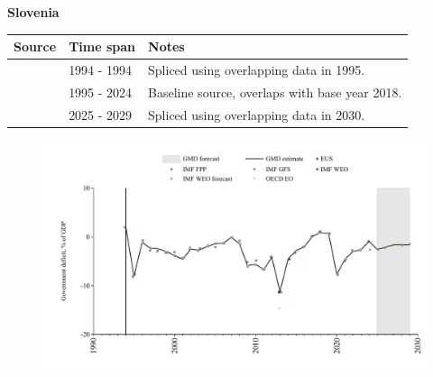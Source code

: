 \documentclass[12pt,a4paper,landscape]{article}
\begin{document}
\begin{adjustbox}{max totalsize={\paperwidth}{\paperheight},center}
\begin{minipage}[t][\textheight][t]{\textwidth}
\vspace*{0.5cm}
{}
\begin{center}
{\Large\bfseries Slovenia}
\end{center}
\vspace{0.5cm}
\begin{table}[H]
\centering
\small
\begin{tabular}{|l|l|l|}
\hline
\textbf{Source} & \textbf{Time span} & \textbf{Notes} \\
\hline
\rowcolor{white}\cite{IMF_GFS}& 1994 - 1994 &Spliced using overlapping data in 1995.\\
\rowcolor{lightgray}\cite{EUS}& 1995 - 2024 &Baseline source, overlaps with base year 2018.\\
\rowcolor{white}\cite{IMF_WEO_forecast}& 2025 - 2029 &Spliced using overlapping data in 2030.\\
\hline
\end{tabular}
\end{table}
\begin{figure}[H]
\centering
\includegraphics[width=\textwidth,height=0.6\textheight,keepaspectratio]{graphs/SVN_govdef_GDP.pdf}
\end{figure}
\end{minipage}
\end{adjustbox}
\end{document}
